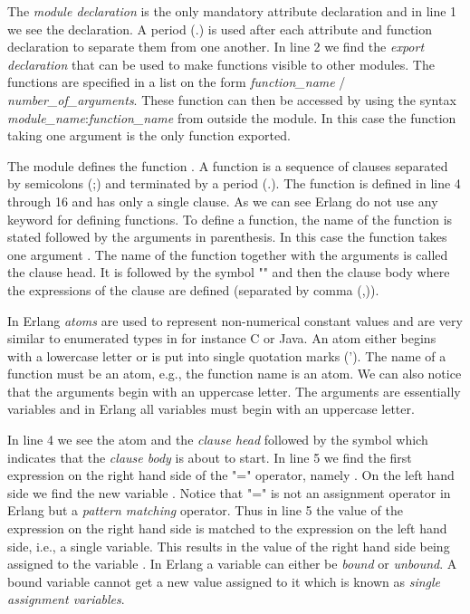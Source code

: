 The \emph{module declaration} is the only mandatory attribute declaration and in line 1 we see the declaration. A period (.) is used after each attribute and function declaration to separate them from one another. In line 2 we find the \emph{export declaration} that can be used to make functions visible to other modules. The functions are specified in a list on the form \emph{function\_name} / \emph{number\_of\_arguments}. These function can then be accessed by using the syntax \emph{module\_name}:\emph{function\_name} from outside the module. In this case the  function taking one argument is the only function exported.

The module defines the function . A function is a sequence of clauses separated by semicolons (;) and terminated by a period (.). The function  is defined in line 4 through 16 and has only a single clause. As we can see Erlang do not use any keyword for defining functions. To define a function, the name of the function is stated followed by the arguments in parenthesis. In this case the function  takes one argument . The name of the function together with the arguments is called the clause head. It is followed by the symbol "\code{->}" and then the clause body where the expressions of the clause are defined (separated by comma (,)).

In Erlang \emph{atoms} are used to represent non-numerical constant values and are very similar to enumerated types in for instance C or Java. An atom either begins with a lowercase letter or is put into single quotation marks ('). The name of a function must be an atom, e.g., the function name  is an atom. We can also notice that the arguments begin with an uppercase letter. The arguments are essentially variables and in Erlang all variables must begin with an uppercase letter.

In line 4 we see the atom  and the \emph{clause head}  followed by the symbol \code{->} which indicates that the \emph{clause body} is about to start. In line 5 we find the first expression on the right hand side of the "=" operator, namely . On the left hand side we find the new variable . Notice that "=" is not an assignment operator in Erlang but a \emph{pattern matching} operator. Thus in line 5 the value of the expression on the right hand side is matched to the expression on the left hand side, i.e., a single variable. This results in the value of the right hand side being assigned to the variable . In Erlang a variable can either be \emph{bound} or \emph{unbound}. A bound variable cannot get a new value assigned to it which is known as \emph{single assignment variables}.

